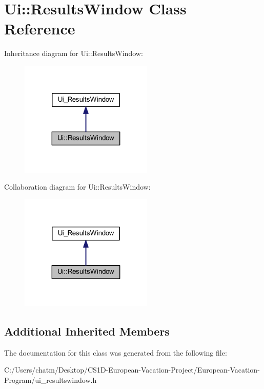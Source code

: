 \hypertarget{class_ui_1_1_results_window}{}\section{Ui\+::Results\+Window Class Reference}
\label{class_ui_1_1_results_window}


Inheritance diagram for Ui\+::Results\+Window\+:
\nopagebreak
\begin{figure}[H]
\begin{center}
\leavevmode
\includegraphics[width=179pt]{class_ui_1_1_results_window__inherit__graph}
\end{center}
\end{figure}


Collaboration diagram for Ui\+::Results\+Window\+:
\nopagebreak
\begin{figure}[H]
\begin{center}
\leavevmode
\includegraphics[width=179pt]{class_ui_1_1_results_window__coll__graph}
\end{center}
\end{figure}
\subsection*{Additional Inherited Members}


The documentation for this class was generated from the following file\+:\begin{DoxyCompactItemize}
\item 
C\+:/\+Users/chatm/\+Desktop/\+C\+S1\+D-\/\+European-\/\+Vacation-\/\+Project/\+European-\/\+Vacation-\/\+Program/ui\+\_\+resultswindow.\+h\end{DoxyCompactItemize}
